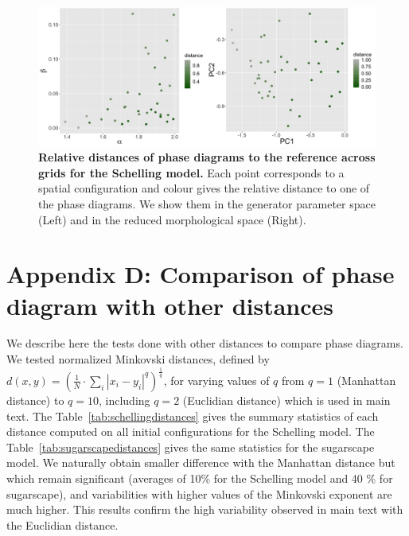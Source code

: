 \documentclass{JASSS}
\begin{document}

\begin{figure}[!t]
\centering
\includegraphics[width=\textwidth]{figures/Fig8.png}
\caption{\textbf{Relative distances of phase diagrams to the reference across grids for the Schelling model.} Each point corresponds to a spatial configuration and colour gives the relative distance to one of the phase diagrams. We show them in the generator parameter space (Left) and in the reduced morphological space (Right).\label{fig:schelling-distance-meta}}
\end{figure}


\section{Appendix D: Comparison of phase diagram with other distances}

\label{app:distances}

We describe here the tests done with other distances to compare phase diagrams. We tested normalized Minkovski distances, defined by $d(x,y) = \left(\frac{1}{N}\cdot \sum_i \left|x_i - y_i\right|^{q}\right)^{\frac{1}{q}}$, for varying values of $q$ from $q = 1$ (Manhattan distance) to $q = 10$, including $q = 2$ (Euclidian distance) which is used in main text. The Table~\ref{tab:schellingdistances} gives the summary statistics of each distance computed on all initial configurations for the Schelling model. The Table~\ref{tab:sugarscapedistances} gives the same statistics for the sugarscape model. We naturally obtain smaller difference with the Manhattan distance but which remain significant (averages of 10\% for the Schelling model and 40 \% for sugarscape), and variabilities with higher values of the Minkovski exponent are much higher. This results confirm the high variability observed in main text with the Euclidian distance.
\end{document}
